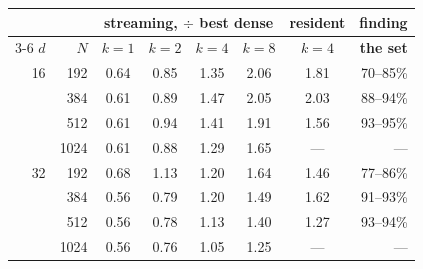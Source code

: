 \begin{tabular}{rrcccccr}
\toprule
& & \multicolumn{4}{c}{\textbf{streaming}, $\div$ best dense} & \textbf{resident} & \textbf{finding} \\
\cmidrule(lr){3-6}
$d$ & $N$ & $k{=}1$ & $k{=}2$ & $k{=}4$ & $k{=}8$ & $k{=}4$ & \textbf{the set} \\
\midrule
16 & 192 & 0.64 & 0.85 & 1.35 & 2.06 & 1.81 & 70--85\% \\
 & 384 & 0.61 & 0.89 & 1.47 & 2.05 & 2.03 & 88--94\% \\
 & 512 & 0.61 & 0.94 & 1.41 & 1.91 & 1.56 & 93--95\% \\
 & 1024 & 0.61 & 0.88 & 1.29 & 1.65 & --- & --- \\
\midrule
32 & 192 & 0.68 & 1.13 & 1.20 & 1.64 & 1.46 & 77--86\% \\
 & 384 & 0.56 & 0.79 & 1.20 & 1.49 & 1.62 & 91--93\% \\
 & 512 & 0.56 & 0.78 & 1.13 & 1.40 & 1.27 & 93--94\% \\
 & 1024 & 0.56 & 0.76 & 1.05 & 1.25 & --- & --- \\
\bottomrule
\end{tabular}%
